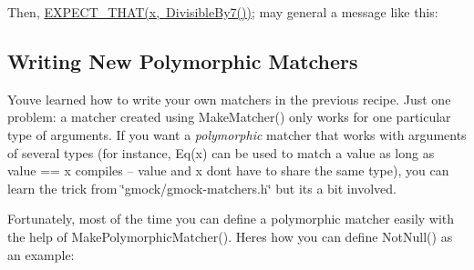\begin{DoxyCode}{0}
\DoxyCodeLine{ \textcolor{keyword}{public}:}
\DoxyCodeLine{    \}}
\DoxyCodeLine{  \}}
\DoxyCodeLine{\};}
\end{DoxyCode}


Then, {\ttfamily \mbox{\hyperlink{_obj__test_2lib_2googletest-release-1_88_81_2googlemock_2include_2gmock_2gmock-matchers_8h_ac31e206123aa702e1152bb2735b31409}{E\+X\+P\+E\+C\+T\+\_\+\+T\+H\+A\+T(x, Divisible\+By7())}};} may general a message like this\+: 
\begin{DoxyCode}{0}
\end{DoxyCode}


\subsection*{Writing New Polymorphic Matchers}

You\textquotesingle{}ve learned how to write your own matchers in the previous recipe. Just one problem\+: a matcher created using {\ttfamily Make\+Matcher()} only works for one particular type of arguments. If you want a {\itshape polymorphic} matcher that works with arguments of several types (for instance, {\ttfamily Eq(x)} can be used to match a {\ttfamily value} as long as {\ttfamily value} == {\ttfamily x} compiles -- {\ttfamily value} and {\ttfamily x} don\textquotesingle{}t have to share the same type), you can learn the trick from {\ttfamily \char`\"{}gmock/gmock-\/matchers.\+h\char`\"{}} but it\textquotesingle{}s a bit involved.

Fortunately, most of the time you can define a polymorphic matcher easily with the help of {\ttfamily Make\+Polymorphic\+Matcher()}. Here\textquotesingle{}s how you can define {\ttfamily Not\+Null()} as an example\+:


